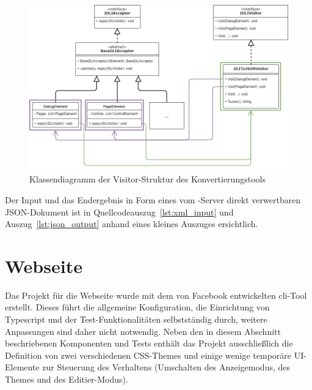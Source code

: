 \begin{figure}
    \centering
    \captionsetup{justification=centering}
    \includegraphics[width=\textwidth]{figures/web-converter_class-diagramm.png}
        \caption{Klassendiagramm der Visitor-Struktur des Konvertierungstools}\label{fig:web-conv_class-diagramm}
\end{figure}

Der Input und das Endergebnis in Form eines vom -Server direkt verwertbaren JSON-Dokument ist in Quellcodeauszug~\ref{lst:xml_input} und Auszug~\ref{lst:json_output} anhand eines kleines Auszuges ersichtlich.





\section{Webseite}
Das Projekt für die Webseite wurde mit dem von Facebook entwickelten \gls{cli}-Tool  erstellt. Dieses führt die allgemeine Konfiguration, die Einrichtung von Typescript und der Test-Funktionalitäten selbstständig durch, weitere Anpassungen sind daher nicht notwendig. Neben den in diesem Abschnitt beschriebenen Komponenten und Tests enthält das Projekt ausschließlich die Definition von zwei verschiedenen CSS-Themes und einige wenige temporäre UI-Elemente zur Steuerung des Verhaltens (Umschalten des Anzeigemodus, des Themes und des Editier-Modus).

